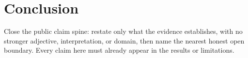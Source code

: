 \section{Conclusion}

Close the public claim spine: restate only what the evidence establishes, with
no stronger adjective, interpretation, or domain, then name the nearest honest
open boundary. Every claim here must already appear in the results or
limitations.
